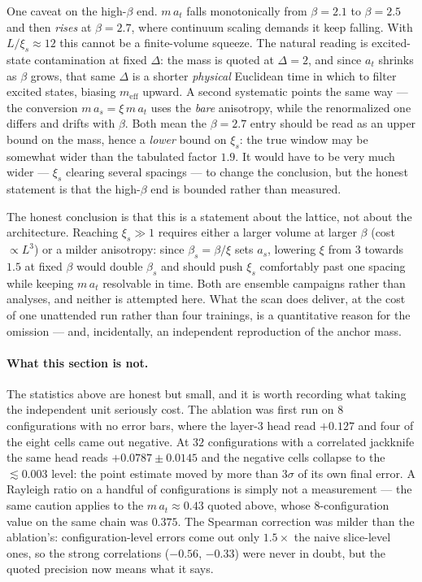 \documentclass[11pt,a4paper]{article}
\newcommand{\meff}{m_{\mathrm{eff}}}
\newcommand{\at}{a_t}
\newcommand{\as}{a_s}
\begin{document}
One caveat on the high-$\beta$ end. $m\,\at$ falls monotonically from
$\beta=2.1$ to $\beta=2.5$ and then \emph{rises} at $\beta=2.7$, where
continuum scaling demands it keep falling. With $L/\xi_s\approx12$ this cannot
be a finite-volume squeeze. The natural reading is excited-state
contamination at fixed $\Delta$: the mass is quoted at $\Delta=2$, and since
$\at$ shrinks as $\beta$ grows, that same $\Delta$ is a shorter \emph{physical}
Euclidean time in which to filter excited states, biasing $\meff$ upward. A
second systematic points the same way --- the conversion $m\,\as=\xi\,m\,\at$
uses the \emph{bare} anisotropy, while the renormalized one differs and drifts
with $\beta$. Both mean the $\beta=2.7$ entry should be read as an upper bound
on the mass, hence a \emph{lower} bound on $\xi_s$: the true window may be
somewhat wider than the tabulated factor $1.9$. It would have to be very much
wider --- $\xi_s$ clearing several spacings --- to change the conclusion, but
the honest statement is that the high-$\beta$ end is bounded rather than
measured.

The honest conclusion is that this is a statement about the lattice, not about
the architecture. Reaching $\xi_s\gg1$ requires either a larger volume at
larger $\beta$ (cost $\propto L^3$) or a milder anisotropy: since
$\beta_s=\beta/\xi$ sets $\as$, lowering $\xi$ from $3$ towards $1.5$ at fixed
$\beta$ would double $\beta_s$ and should push $\xi_s$ comfortably past one
spacing while keeping $m\,\at$ resolvable in time. Both are ensemble campaigns
rather than analyses, and neither is attempted here. What the scan does
deliver, at the cost of one unattended run rather than four trainings, is a
quantitative reason for the omission --- and, incidentally, an independent
reproduction of the anchor mass.

\paragraph{What this section is not.} The statistics above are honest but
small, and it is worth recording what taking the independent unit seriously
cost. The ablation was first run on $8$ configurations with no error bars,
where the layer-3 head read $+0.127$ and four of the eight cells came out
negative. At $32$ configurations with a correlated jackknife the same head
reads $+0.0787\pm0.0145$ and the negative cells collapse to the
$\lesssim0.003$ level: the point estimate moved by more than $3\sigma$ of its
own final error. A Rayleigh ratio on a handful of configurations is simply not
a measurement --- the same caution applies to the $m\,\at\approx0.43$ quoted
above, whose $8$-configuration value on the same chain was $0.375$. The
Spearman correction was milder than the ablation's: configuration-level errors
come out only $1.5\times$ the naive slice-level ones, so the strong
correlations ($-0.56$, $-0.33$) were never in doubt, but the quoted precision
now means what it says.
\end{document}
